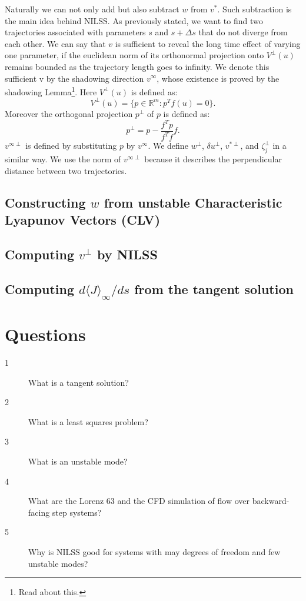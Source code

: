 \documentclass[10pt,twoside,a4paper]{article} %
\begin{document}
Naturally we can not only add but also subtract $w$ from $v^*$. Such subtraction is the main idea behind NILSS. As previously stated, we want to find two trajectories associated with parameters $s$ and $s + \Delta s$ that do not diverge from each other. We can say that $v$ is sufficient to reveal the long time effect of varying one parameter, if the euclidean norm of its orthonormal projection onto $V^\perp (u)$ remains bounded as the trajectory length goes to infinity. We denote this sufficient v by the shadowing direction $v^\infty$, whose existence is proved by the shadowing Lemma\footnote{Read about this.}. Here $V^\perp(u)$ is defined as:
\begin{equation}
  V^\perp(u) = \{ p\in \mathbb{R}^m  : p^T f(u) = 0 \}.
  \label{eq:7}
\end{equation}
Moreover the orthogonal projection $p^\perp$ of $p$ is defined as:
\begin{equation}
  p^\perp = p - \frac{f^T p}{f^Tf}f.
  \label{eq:8}
\end{equation}
$v^{\infty\perp}$ is defined by substituting $p$ by $v^\infty$. We define $w^\perp$, $\delta u ^\perp$, $v^{*\perp}$, and ${\zeta_j^\perp}$ in a similar way. We use the norm of $v^{\infty\perp}$ because it describes the perpendicular distance between two trajectories.
\subsection{Constructing $w$ from unstable Characteristic Lyapunov Vectors (CLV)}\label{3.2}

\subsection{Computing $v^\perp$ by NILSS}\label{3.3}

\subsection{Computing $d\langle J \rangle_\infty /ds$ from the tangent solution}\label{3.4}

\section{Questions}
\begin{description}
  \item [1] What is a tangent solution?
  \item [2] What is a least squares problem?
  \item [3] What is an unstable mode?
  \item [4] What are the Lorenz 63 and the CFD simulation of flow over backward-facing step systems?
  \item [5] Why is NILSS good for systems with may degrees of freedom and few unstable modes?
\end{description}
\newpage
\end{document}
